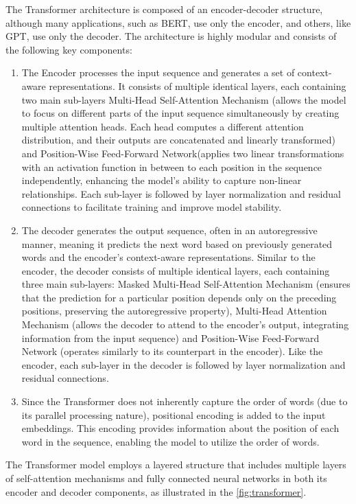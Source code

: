 The Transformer architecture is composed of an encoder-decoder structure, although many applications, such as BERT, use only the encoder, and others, like GPT, use only the decoder. The architecture is highly modular and consists of the following key components:
\begin{enumerate}
\item The Encoder processes the input sequence and generates a set of context-aware representations. It consists of multiple identical layers, each containing two main sub-layers Multi-Head Self-Attention Mechanism (allows the model to focus on different parts of the input sequence simultaneously by creating multiple attention heads. Each head computes a different attention distribution, and their outputs are concatenated and linearly transformed) and Position-Wise Feed-Forward Network(applies two linear transformations with an activation function in between to each position in the sequence independently, enhancing the model's ability to capture non-linear relationships. Each sub-layer is followed by layer normalization and residual connections to facilitate training and improve model stability.
\item The decoder generates the output sequence, often in an autoregressive manner, meaning it predicts the next word based on previously generated words and the encoder's context-aware representations. Similar to the encoder, the decoder consists of multiple identical layers, each containing three main sub-layers: Masked Multi-Head Self-Attention Mechanism (ensures that the prediction for a particular position depends only on the preceding positions, preserving the autoregressive property), Multi-Head Attention Mechanism (allows the decoder to attend to the encoder's output, integrating information from the input sequence) and Position-Wise Feed-Forward Network (operates similarly to its counterpart in the encoder). Like the encoder, each sub-layer in the decoder is followed by layer normalization and residual connections.
\item Since the Transformer does not inherently capture the order of words (due to its parallel processing nature), positional encoding is added to the input embeddings. This encoding provides information about the position of each word in the sequence, enabling the model to utilize the order of words. \cite{Vaswani.12Jun2017}
\end{enumerate}

The Transformer model employs a layered structure that includes multiple layers of self-attention mechanisms and fully connected neural networks in both its encoder and decoder components, as illustrated in the \autoref{fig:transformer}.

